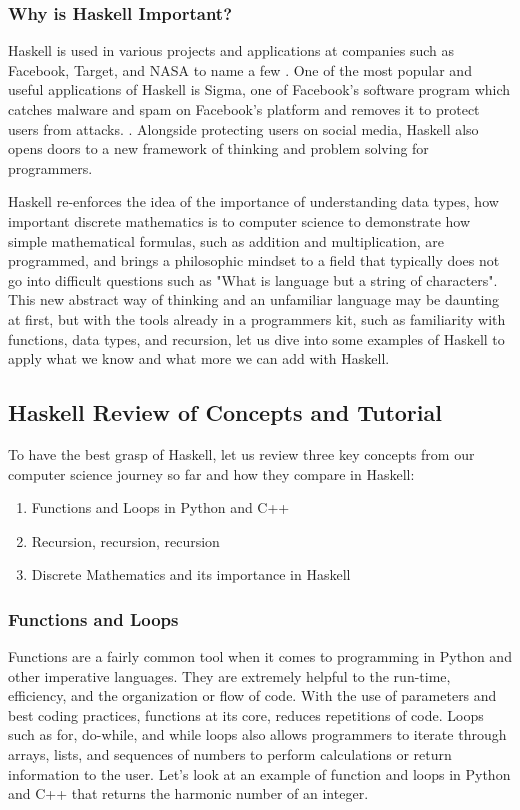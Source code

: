 \documentclass{article}
\begin{document}
\medskip\noindent
\subsubsection{Why is Haskell Important?}
Haskell is used in various projects and applications at companies such as Facebook, Target, and NASA to name a few \cite{serokell.io}. One of the most popular and useful applications of Haskell is Sigma, one of Facebook's software program which catches malware and spam on Facebook's platform and removes it to protect users from attacks. \cite{Facebook Engineering}. Alongside protecting users on social media, Haskell also opens doors to a new framework of thinking and problem solving for programmers. 

\medskip\noindent
Haskell re-enforces the idea of the importance of understanding data types, how important discrete mathematics is to computer science to demonstrate how simple mathematical formulas, such as addition and multiplication, are programmed, and brings a philosophic mindset to a field that typically does not go into difficult questions such as "What is language but a string of characters". This new abstract way of thinking and an unfamiliar language may be daunting at first, but with the tools already in a programmers kit, such as familiarity with functions, data types, and recursion, let us dive into some examples of Haskell to apply what we know and what more we can add with Haskell.

\subsection{Haskell Review of Concepts and Tutorial}

To have the best grasp of Haskell, let us review three key concepts from our computer science journey so far and how they compare in Haskell:

\begin{enumerate}
    \item Functions and Loops in Python and C++
    \item Recursion, recursion, recursion
    \item Discrete Mathematics and its importance in Haskell
\end{enumerate}

\subsubsection{Functions and Loops}
Functions are a fairly common tool when it comes to programming in Python and other imperative languages. They are extremely helpful to the run-time, efficiency, and the organization or flow of code. With the use of parameters and best coding practices, functions at its core, reduces repetitions of code. Loops such as for, do-while, and while loops also allows programmers to iterate through arrays, lists, and sequences of numbers to perform calculations or return information to the user. Let's look at an example of function and loops in Python and C++ that returns the harmonic number of an integer. 
\end{document}
